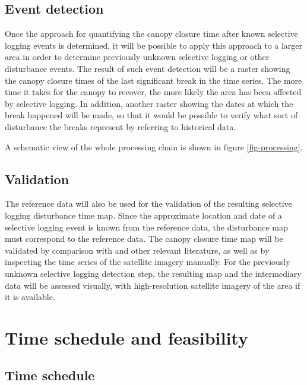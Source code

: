 \documentclass[a4paper,10pt]{article}
\begin{document}
\subsection{Event detection}

Once the approach for quantifying the canopy closure time after known selective logging events is determined, it will be possible to apply this approach to a larger area in order to determine previously unknown selective logging or other disturbance events. The result of such event detection will be a raster showing the canopy closure times of the last significant break in the time series. The more time it takes for the canopy to recover, the more likely the area has been affected by selective logging. In addition, another raster showing the dates at which the break happened will be made, so that it would be possible to verify what sort of disturbance the breaks represent by referring to historical data.

A schematic view of the whole processing chain is shown in figure \ref{fig-processing}.

\subsection{Validation}

The reference data will also be used for the validation of the resulting selective logging disturbance time map. Since the approximate location and date of a selective logging event is known from the reference data, the disturbance map must correspond to the reference data. The canopy closure time map will be validated by comparison with \citet{broadbent_recovery_2006} and other relevant literature, as well as by inspecting the time series of the satellite imagery manually. For the previously unknown selective logging detection step, the resulting map and the intermediary data will be assessed visually, with high-resolution satellite imagery of the area if it is available.

\section{Time schedule and feasibility}

\subsection{Time schedule}
\end{document}
